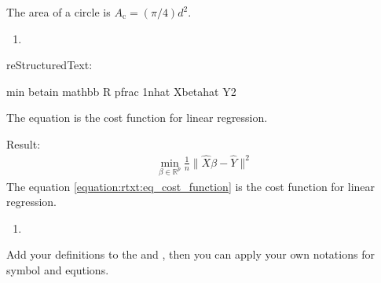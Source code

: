 \documentclass[letterpaper,12pt,english]{sphinxmanual}
\begin{document}
The area of a circle is \(A_\text{c} = (\pi/4) d^2\).
\begin{enumerate}
\def\theenumi{\arabic{enumi}}
\def\labelenumi{\theenumi .}
\makeatletter\def\p@enumii{\p@enumi \theenumi .}\makeatother
\setcounter{enumi}{1}
\item {} 

\end{enumerate}

reStructuredText:

\begin{sphinxVerbatim}[commandchars=\\\{\}]
 
        

       \PYGZbs{}min \PYGZus{}\PYGZob{}\PYGZbs{}beta\PYGZbs{}in \PYGZbs{}mathbb \PYGZob{}R\PYGZcb{} \PYGZca{}\PYGZob{}p\PYGZcb{}\PYGZcb{}\PYGZob{}\PYGZbs{}frac \PYGZob{}1\PYGZcb{}\PYGZob{}n\PYGZcb{}\PYGZcb{}\PYGZbs{}\textbar{}\PYGZob{}\PYGZbs{}hat \PYGZob{}X\PYGZcb{}\PYGZcb{}\PYGZbs{}beta\PYGZhy{}\PYGZob{}\PYGZbs{}hat \PYGZob{}Y\PYGZcb{}\PYGZcb{}\PYGZbs{}\textbar{}\PYGZca{}\PYGZob{}2\PYGZcb{}

The equation  is the cost function for linear regression.
\end{sphinxVerbatim}

Result:
\begin{equation}\label{equation:rtxt:eq_cost_function}
\begin{split}\min _{\beta\in \mathbb {R} ^{p}}{\frac {1}{n}}\|{\hat {X}}\beta-{\hat {Y}}\|^{2}\end{split}
\end{equation}
The equation \eqref{equation:rtxt:eq_cost_function} is the cost function for linear regression.
\begin{enumerate}
\def\theenumi{\arabic{enumi}}
\def\labelenumi{\theenumi .}
\makeatletter\def\p@enumii{\p@enumi \theenumi .}\makeatother
\setcounter{enumi}{2}
\item {} 

\end{enumerate}

Add your definitions to the  and , then you can apply your own notations for symbol and equtions.
\end{document}
